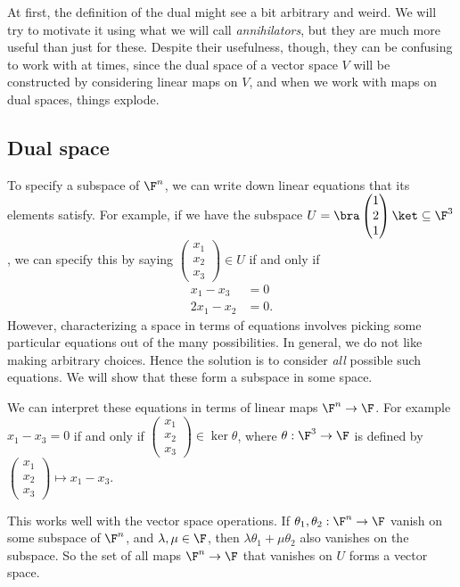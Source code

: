 \documentclass[a4paper]{article}
\begin{document}
At first, the definition of the dual might see a bit arbitrary and weird. We will try to motivate it using what we will call \emph{annihilators}, but they are much more useful than just for these. Despite their usefulness, though, they can be confusing to work with at times, since the dual space of a vector space $V$ will be constructed by considering linear maps on $V$, and when we work with maps on dual spaces, things explode.

\subsection{Dual space}
To specify a subspace of $\F^n$, we can write down linear equations that its elements satisfy. For example, if we have the subspace $U = \bra \begin{pmatrix} 1\\2\\1 \end{pmatrix}\ket\subseteq \F^3$, we can specify this by saying $\begin{pmatrix}x_1\\ x_2\\ x_3\end{pmatrix} \in U$ if and only if
\begin{align*}
  x_1 - x_3 &= 0\\
  2x_1 - x_2 &= 0.
\end{align*}
However, characterizing a space in terms of equations involves picking some particular equations out of the many possibilities. In general, we do not like making arbitrary choices. Hence the solution is to consider \emph{all} possible such equations. We will show that these form a subspace in some space.

We can interpret these equations in terms of linear maps $\F^n \to \F$. For example $x_1 - x_3 = 0$ if and only if $\begin{pmatrix}x_1\\x_2\\x_3\end{pmatrix} \in \ker \theta$, where $\theta: \F^3 \to \F$ is defined by $\begin{pmatrix}x_1\\x_2\\x_3\end{pmatrix} \mapsto x_1 - x_3$.

This works well with the vector space operations. If $\theta_1, \theta_2: \F^n \to \F$ vanish on some subspace of $\F^n$, and $\lambda, \mu\in \F$, then $\lambda \theta_1 + \mu \theta_2$ also vanishes on the subspace. So the set of all maps $\F^n \to \F$ that vanishes on $U$ forms a vector space.
\end{document}
